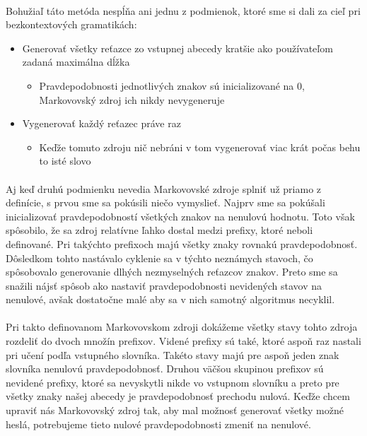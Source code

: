\paragraph{}
Bohužiaľ táto metóda nespĺňa ani jednu z podmienok, ktoré sme si dali za cieľ pri bezkontextových gramatikách:
\begin{itemize}
	\item Generovať všetky reťazce zo vstupnej abecedy kratšie ako používateľom zadaná maximálna dĺžka
	\begin{itemize}
		\item Pravdepodobnosti jednotlivých znakov sú inicializované na 0, Markovovský zdroj ich nikdy nevygeneruje
	\end{itemize}
	\item Vygenerovať každý reťazec práve raz
	\begin{itemize}
		\item Keďže tomuto zdroju nič nebráni v tom vygenerovať viac krát počas behu to isté slovo
	\end{itemize}
\end{itemize}

\paragraph{}
Aj keď druhú podmienku nevedia Markovovské zdroje splniť už priamo z definície, s prvou sme sa pokúsili niečo vymyslieť. Najprv sme sa pokúšali inicializovať pravdepodobností všetkých znakov na nenulovú hodnotu. Toto však spôsobilo, že sa zdroj relatívne ľahko dostal medzi prefixy, ktoré neboli definované. Pri takýchto prefixoch majú všetky znaky rovnakú pravdepodobnosť. Dôsledkom tohto nastávalo cyklenie sa v týchto neznámych stavoch, čo spôsobovalo generovanie dlhých nezmyselných reťazcov znakov. Preto sme sa snažili nájsť spôsob ako nastaviť pravdepodobnosti nevidených stavov na nenulové, avšak dostatočne malé aby sa v nich samotný algoritmus necyklil.

\paragraph{}
Pri takto definovanom Markovovskom zdroji dokážeme všetky stavy tohto zdroja rozdeliť do dvoch množín prefixov. Videné prefixy sú také, ktoré aspoň raz nastali pri učení podľa vstupného slovníka. Takéto stavy majú pre aspoň jeden znak slovníka nenulovú pravdepodobnosť. Druhou väčšou skupinou prefixov sú nevidené prefixy, ktoré sa nevyskytli nikde vo vstupnom slovníku a preto pre všetky znaky našej abecedy je pravdepodobnosť prechodu nulová. Keďže chcem upraviť nás Markovovský zdroj tak, aby mal možnosť generovať všetky možné heslá, potrebujeme tieto nulové pravdepodobnosti zmeniť na nenulové. 

